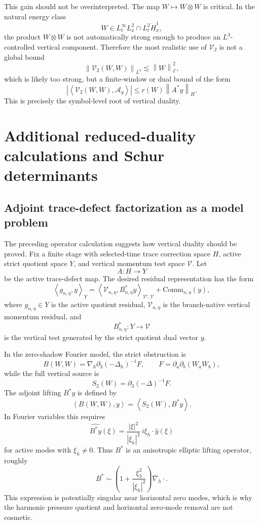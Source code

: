\documentclass[11pt]{article}
\numberwithin{equation}{section}
\newcommand{\norm}[2]{\left\|#1\right\|_{#2}}
\newcommand{\ip}[2]{\left\langle #1,#2\right\rangle}
\newcommand{\calA}{\mathcal A}
\newcommand{\calE}{\mathcal E}
\newcommand{\calV}{\mathcal V}
\begin{document}
This gain should not be overinterpreted.  The map \(W\mapsto W\otimes W\) is critical.  In the natural energy class
\[
W\in L_t^\infty L_x^2\cap L_t^2\dot H_x^1,
\]
the product \(W\otimes W\) is not automatically strong enough to produce an \(L^3\)-controlled vertical component.  Therefore the most realistic use of \(\calV_2\) is not a global bound
\[
\norm{\calV_2(W,W)}{L^3}\lesssim \norm{W}{\calE}^2,
\]
which is likely too strong, but a finite-window or dual bound of the form
\begin{equation}\label{eq:dual-V2-target}
\left|\ip{\calV_2(W,W)}{\calA_y}\right|
\le r(W)\norm{A^*y}{H}.
\end{equation}
This is precisely the symbol-level root of vertical duality.


\section{Additional reduced-duality calculations and Schur determinants}\label{app:schur-details}

\subsection{Adjoint trace-defect factorization as a model problem}\label{subsec:adjoint-factorization-model}

The preceding operator calculation suggests how vertical duality should be proved.  Fix a finite stage with selected-time trace correction space \(H\), active strict quotient space \(Y\), and vertical momentum test space \(\calV\).  Let
\[
A:H\to Y
\]
be the active trace-defect map.  The desired residual representation has the form
\begin{equation}\label{eq:residual-representation-model}
\ip{g_{n,\eta}}{y}_Y
=
\ip{\calV_{n,\eta}}{B_{n,\eta}^*y}_{\calV',\calV}
+\mathrm{Comm}_{n,\eta}(y),
\end{equation}
where \(g_{n,\eta}\in Y\) is the active quotient residual, \(\calV_{n,\eta}\) is the branch-native vertical momentum residual, and
\[
B_{n,\eta}^*:Y\to\calV
\]
is the vertical test generated by the strict quotient dual vector \(y\).

In the zero-shadow Fourier model, the strict obstruction is
\[
B(W,W)=\nabla_h\partial_3(-\Delta_h)^{-1}F,
\qquad
F=\partial_a\partial_b(W_aW_b),
\]
while the full vertical source is
\[
S_2(W)=\partial_3(-\Delta)^{-1}F.
\]
The adjoint lifting \(B^*y\) is defined by
\[
\ip{B(W,W)}{y}=\ip{S_2(W)}{B^*y}.
\]
In Fourier variables this requires
\begin{equation}\label{eq:Bstar-symbol}
\widehat{B^*y}(\xi)
=
\frac{|\xi|^2}{|\xi_h|^2}
\, i\xi_h\cdot\widehat y(\xi)
\end{equation}
for active modes with \(\xi_h\ne0\).  Thus \(B^*\) is an anisotropic elliptic lifting operator, roughly
\begin{equation}\label{eq:Bstar-anisotropic}
B^*\sim \left(1+\frac{\xi_3^2}{|\xi_h|^2}\right)\nabla_h\cdot.
\end{equation}
This expression is potentially singular near horizontal zero modes, which is why the harmonic pressure quotient and horizontal zero-mode removal are not cosmetic.
\end{document}
